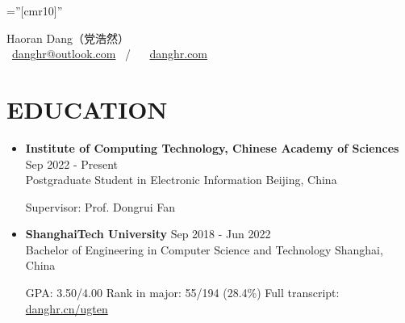 \documentclass[a4paper,10pt]{ctexart} %
\begin{document}
\pagestyle{empty} %

\font\fb=''[cmr10]'' %



\begin{center}
    {\LARGE Haoran Dang}（党浩然） \\
     \  \href{mailto:danghr@outlook.com}{danghr@outlook.com} \  / \   \  \href{https://www.danghr.com}{danghr.com} \\
\end{center}



\section{EDUCATION}

    \begin{itemize}
        \item \textbf{Institute of Computing Technology, Chinese Academy of Sciences} \hfill Sep 2022 - Present \\
        Postgraduate Student in Electronic Information \hfill Beijing, China \\
        \begin{small}
            Supervisor: Prof. Dongrui Fan
        \end{small}
        \item \textbf{ShanghaiTech University} \hfill Sep 2018 - Jun 2022\\
        Bachelor of Engineering in Computer Science and Technology \hfill Shanghai, China \\
        \begin{small}
            GPA: 3.50/4.00 \quad Rank in major: 55/194 (28.4\%) \quad
            Full transcript: \href{https://danghr.cn/ugten}{danghr.cn/ugten}
        \end{small}
    \end{itemize}


\end{document}
